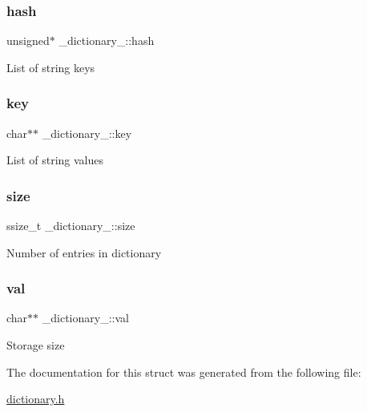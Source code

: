 \subsubsection{\texorpdfstring{hash}{hash}}
{\footnotesize\ttfamily unsigned$\ast$ \+\_\+dictionary\+\_\+\+::hash}

List of string keys \mbox{\label{struct__dictionary___a3c962bd7edff49be125396596d1bec75}} 
\subsubsection{\texorpdfstring{key}{key}}
{\footnotesize\ttfamily char$\ast$$\ast$ \+\_\+dictionary\+\_\+\+::key}

List of string values \mbox{\label{struct__dictionary___a8be0f96d0b5a75d61775306d5e908867}} 
\subsubsection{\texorpdfstring{size}{size}}
{\footnotesize\ttfamily ssize\+\_\+t \+\_\+dictionary\+\_\+\+::size}

Number of entries in dictionary \mbox{\label{struct__dictionary___a7a89c8fb24cb365745431d881f8f0afd}} 
\subsubsection{\texorpdfstring{val}{val}}
{\footnotesize\ttfamily char$\ast$$\ast$ \+\_\+dictionary\+\_\+\+::val}

Storage size 

The documentation for this struct was generated from the following file\+:\begin{DoxyCompactItemize}
\item 
\hyperlink{dictionary_8h}{dictionary.\+h}\end{DoxyCompactItemize}

